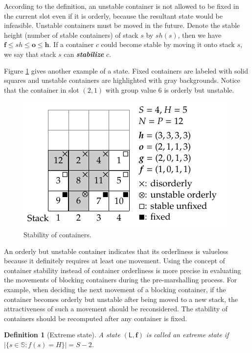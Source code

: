 \documentclass[review,3p,times,12pt,number]{elsarticle}\usepackage{amsmath}\usepackage{amssymb}
\newtheorem{definition}{Definition}
\renewcommand{\emph}[1]{\textbf{\textit{#1}}}
\begin{document}
According to the definition, an unstable container is not allowed to be fixed in the current slot even if it is orderly, because the resultant state would be infeasible.
Unstable containers must be moved in the future. Denote the stable height (number of stable containers) of stack $s$ by $\mathit{sh}(s)$, then we have $\boldsymbol{f}\le \boldsymbol{\mathit{sh}}\le \boldsymbol{o}\le \boldsymbol{h}$. If a container $c$ could become stable by moving it onto stack $s$, we say that stack $s$ can \emph{stabilize} $c$.

Figure \ref{fig:stable} gives another example of a state. Fixed containers are labeled with solid squares and unstable containers are highlighted with gray backgrounds. Notice that the container in slot $(2,1)$ with group value $6$ is orderly but unstable.

\begin{figure}[htbp]
\centering
\includegraphics{figs/stable.pdf}
\caption{Stability of containers.}
\label{fig:stable}
\end{figure}

An orderly but unstable container indicates that its orderliness is valueless because it definitely requires at least one movement.
Using the concept of container stability instead of container orderliness is more precise in evaluating the movements of blocking containers during the pre-marshalling process.
For example, when deciding the next movement of a blocking container, if the container becomes orderly but unstable after being moved to a new stack, the attractiveness of such a movement should be reconsidered. The stability of containers should be recomputed after any container is fixed.



\begin{definition}[Extreme state]
A state $(\mathsf{L},\boldsymbol{f})$ is called an extreme state if $|\{s\in\mathbb{S}: f(s)=H\}|= S-2$.
\end{definition}
\end{document}
